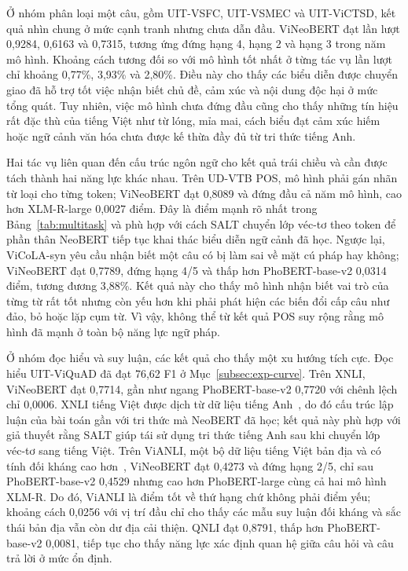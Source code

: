 Ở nhóm phân loại một câu, gồm UIT-VSFC, UIT-VSMEC và UIT-ViCTSD, kết quả nhìn chung ở
mức cạnh tranh nhưng chưa dẫn đầu. ViNeoBERT đạt lần lượt 0,9284, 0,6163 và 0,7315,
tương ứng đứng hạng 4, hạng 2 và hạng 3 trong năm mô hình. Khoảng cách tương đối so với
mô hình tốt nhất ở từng tác vụ lần lượt chỉ khoảng 0,77\%, 3,93\% và 2,80\%. Điều này
cho thấy các biểu diễn được chuyển giao đã hỗ trợ tốt việc nhận biết chủ đề, cảm xúc và
nội dung độc hại ở mức tổng quát. Tuy nhiên, việc mô hình chưa đứng đầu cũng cho thấy
những tín hiệu rất đặc thù của tiếng Việt như từ lóng, mỉa mai, cách biểu đạt cảm xúc
hiếm hoặc ngữ cảnh văn hóa chưa được kế thừa đầy đủ từ tri thức tiếng Anh.

Hai tác vụ liên quan đến cấu trúc ngôn ngữ cho kết quả trái chiều và cần được tách thành
hai năng lực khác nhau. Trên UD-VTB POS, mô hình phải gán nhãn từ loại cho từng token;
ViNeoBERT đạt 0,8089 và đứng đầu cả năm mô hình, cao hơn XLM-R-large 0,0027 điểm. Đây là
điểm mạnh rõ nhất trong Bảng~\ref{tab:multitask} và phù hợp với cách SALT chuyển lớp
véc-tơ theo token để phần thân NeoBERT tiếp tục khai thác biểu diễn ngữ cảnh đã học.
Ngược lại, ViCoLA-syn yêu cầu nhận biết một câu có bị làm sai về mặt cú pháp hay không;
ViNeoBERT đạt 0,7789, đứng hạng 4/5 và thấp hơn PhoBERT-base-v2 0,0314 điểm, tương
đương 3,88\%. Kết quả này cho thấy mô hình nhận biết vai trò của từng từ rất tốt nhưng
còn yếu hơn khi phải phát hiện các biến đổi cấp câu như đảo, bỏ hoặc lặp cụm từ. Vì vậy,
không thể từ kết quả POS suy rộng rằng mô hình đã mạnh ở toàn bộ năng lực ngữ pháp.

Ở nhóm đọc hiểu và suy luận, các kết quả cho thấy một xu hướng tích cực. Đọc hiểu
UIT-ViQuAD đã đạt 76,62 F1 ở Mục~\ref{subsec:exp-curve}. Trên XNLI, ViNeoBERT đạt
0,7714, gần như ngang PhoBERT-base-v2 0,7720 với chênh lệch chỉ 0,0006. XNLI tiếng Việt
được dịch từ dữ liệu tiếng Anh~\cite{conneau2018xnli}, do đó cấu trúc lập luận của bài
toán gần với tri thức mà NeoBERT đã học; kết quả này phù hợp với giả thuyết rằng SALT
giúp tái sử dụng tri thức tiếng Anh sau khi chuyển lớp véc-tơ sang tiếng Việt. Trên
ViANLI, một bộ dữ liệu tiếng Việt bản địa và có tính đối kháng cao
hơn~\cite{huynh2024vianli}, ViNeoBERT đạt 0,4273 và đứng hạng 2/5, chỉ sau
PhoBERT-base-v2 0,4529 nhưng cao hơn PhoBERT-large cùng cả hai mô hình XLM-R. Do đó,
ViANLI là điểm tốt về thứ hạng chứ không phải điểm yếu; khoảng cách 0,0256 với vị trí đầu
chỉ cho thấy các mẫu suy luận đối kháng và sắc thái bản địa vẫn còn dư địa cải thiện.
QNLI đạt 0,8791, thấp hơn PhoBERT-base-v2 0,0081, tiếp tục cho thấy năng lực xác định
quan hệ giữa câu hỏi và câu trả lời ở mức ổn định.

